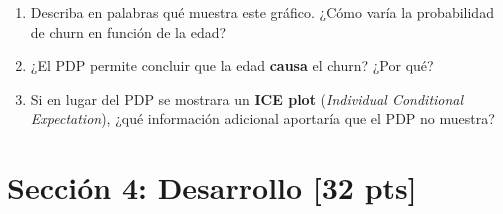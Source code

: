 \documentclass[11pt,a4paper]{article}
\newcommand{\puntaje}[1]{\textbf{[#1 pts]}}
\begin{document}
\begin{enumerate}[label=\textbf{\alph*)}]
  \item Describa en palabras qu\'e muestra este gr\'afico. ¿C\'omo var\'ia la probabilidad de churn en funci\'on de la edad?

  \vspace{2.5cm}

  \item ¿El PDP permite concluir que la edad \textbf{causa} el churn? ¿Por qu\'e?

  \vspace{2.5cm}

  \item Si en lugar del PDP se mostrara un \textbf{ICE plot} (\textit{Individual Conditional Expectation}), ¿qu\'e informaci\'on adicional aportar\'ia que el PDP no muestra?

  \vspace{2.5cm}
\end{enumerate}

\vspace{0.3cm}

\section*{Secci\'on 4: Desarrollo \puntaje{32}}
\end{document}
